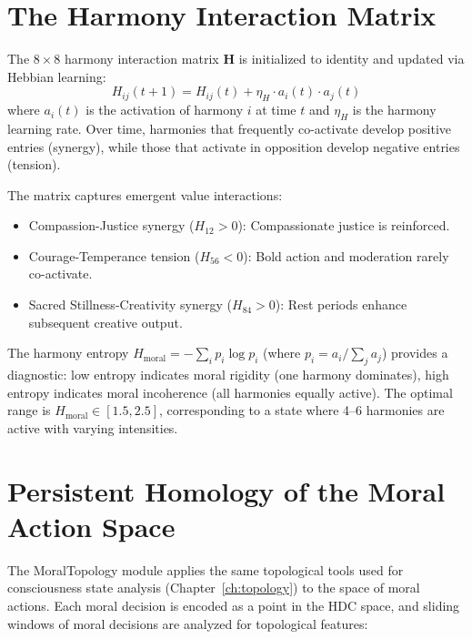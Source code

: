 \documentclass[12pt]{book}
\begin{document}
\section{The Harmony Interaction Matrix}

The $8 \times 8$ harmony interaction matrix $\mathbf{H}$ is initialized to identity and updated via Hebbian learning:
\begin{equation}
H_{ij}(t+1) = H_{ij}(t) + \eta_H \cdot a_i(t) \cdot a_j(t)
\end{equation}
where $a_i(t)$ is the activation of harmony $i$ at time $t$ and $\eta_H$ is the harmony learning rate. Over time, harmonies that frequently co-activate develop positive entries (synergy), while those that activate in opposition develop negative entries (tension).

The matrix captures emergent value interactions:
\begin{itemize}
  \item Compassion-Justice synergy ($H_{12} > 0$): Compassionate justice is reinforced.
  \item Courage-Temperance tension ($H_{56} < 0$): Bold action and moderation rarely co-activate.
  \item Sacred Stillness-Creativity synergy ($H_{84} > 0$): Rest periods enhance subsequent creative output.
\end{itemize}

The harmony entropy $H_{\text{moral}} = -\sum_i p_i \log p_i$ (where $p_i = a_i / \sum_j a_j$) provides a diagnostic: low entropy indicates moral rigidity (one harmony dominates), high entropy indicates moral incoherence (all harmonies equally active). The optimal range is $H_{\text{moral}} \in [1.5, 2.5]$, corresponding to a state where 4--6 harmonies are active with varying intensities.

\section{Persistent Homology of the Moral Action Space}

The MoralTopology module applies the same topological tools used for consciousness state analysis (Chapter~\ref{ch:topology}) to the space of moral actions. Each moral decision is encoded as a point in the HDC space, and sliding windows of moral decisions are analyzed for topological features:
\end{document}
